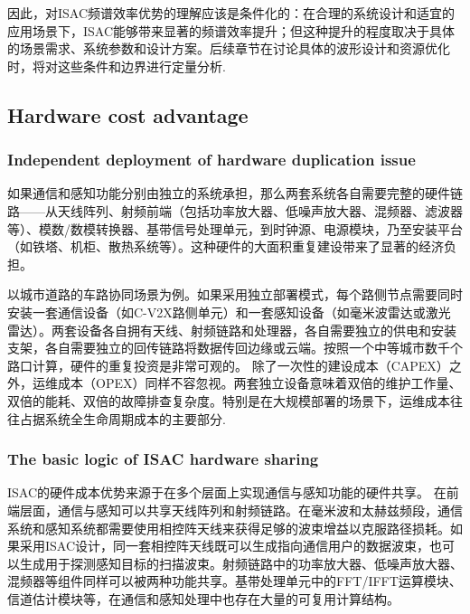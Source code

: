 因此，对ISAC频谱效率优势的理解应该是条件化的：在合理的系统设计和适宜的应用场景下，ISAC能够带来显著的频谱效率提升；但这种提升的程度取决于具体的场景需求、系统参数和设计方案。后续章节在讨论具体的波形设计和资源优化时，将对这些条件和边界进行定量分析.

\subsection{Hardware cost advantage}
\label{subsec:ch1-isac-core value-hardware}
\subsubsection{Independent deployment of hardware duplication issue}
\label{subsubsec:ch1-isac-core value-hardware-duplication}

如果通信和感知功能分别由独立的系统承担，那么两套系统各自需要完整的硬件链路——从天线阵列、射频前端（包括功率放大器、低噪声放大器、混频器、滤波器等）、模数/数模转换器、基带信号处理单元，到时钟源、电源模块，乃至安装平台（如铁塔、机柜、散热系统等）。这种硬件的大面积重复建设带来了显著的经济负担。

以城市道路的车路协同场景为例。如果采用独立部署模式，每个路侧节点需要同时安装一套通信设备（如C-V2X路侧单元）和一套感知设备（如毫米波雷达或激光雷达）。两套设备各自拥有天线、射频链路和处理器，各自需要独立的供电和安装支架，各自需要独立的回传链路将数据传回边缘或云端。按照一个中等城市数千个路口计算，硬件的重复投资是非常可观的。
除了一次性的建设成本（CAPEX）之外，运维成本（OPEX）同样不容忽视。两套独立设备意味着双倍的维护工作量、双倍的能耗、双倍的故障排查复杂度。特别是在大规模部署的场景下，运维成本往往占据系统全生命周期成本的主要部分.

\subsubsection{The basic logic of ISAC hardware sharing}
\label{subsubsec:ch1-isac-core value-hardware-sharing}

ISAC的硬件成本优势来源于在多个层面上实现通信与感知功能的硬件共享。
在前端层面，通信与感知可以共享天线阵列和射频链路。在毫米波和太赫兹频段，通信系统和感知系统都需要使用相控阵天线来获得足够的波束增益以克服路径损耗。如果采用ISAC设计，同一套相控阵天线既可以生成指向通信用户的数据波束，也可以生成用于探测感知目标的扫描波束。射频链路中的功率放大器、低噪声放大器、混频器等组件同样可以被两种功能共享。基带处理单元中的FFT/IFFT运算模块、信道估计模块等，在通信和感知处理中也存在大量的可复用计算结构。

